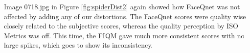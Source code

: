 
Image 0718.jpg in Figure \ref{fig:spiderDist2} again showed how FaceQnet was not affected by adding any of our distortions. The FaceQnet scores were quality wise closely related to the subjective scores, whereas the quality perception by ISO Metrics was off. This time, the FIQM gave much more consistent scores with no large spikes, which goes to show its inconsistency. 


